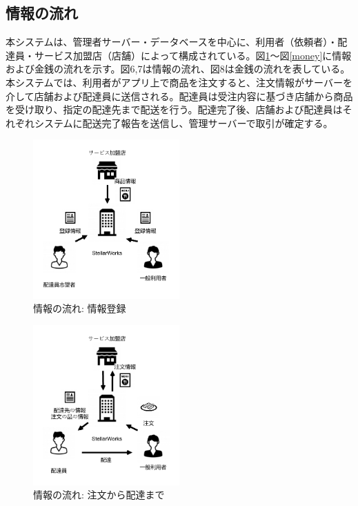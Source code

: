 \subsection{情報の流れ}
本システムは、管理者サーバー・データベースを中心に、利用者（依頼者）・配達員・サービス加盟店（店舗）によって構成されている。図\ref{system}～図\ref{money}に情報および金銭の流れを示す。図6,7は情報の流れ、図8は金銭の流れを表している。
本システムでは、利用者がアプリ上で商品を注文すると、注文情報がサーバーを介して店舗および配達員に送信される。配達員は受注内容に基づき店舗から商品を受け取り、指定の配達先まで配送を行う。配達完了後、店舗および配達員はそれぞれシステムに配送完了報告を送信し、管理サーバーで取引が確定する。

\begin{figure}[H]
  \centering
  \includegraphics[width=0.5\textwidth]{情報の流れ.drawio.pdf}
  \caption{情報の流れ: 情報登録}
  \label{system}
\end{figure}

\begin{figure}[H]
  \centering
  \includegraphics[width=0.5\textwidth]{流れ.drawio.pdf}
  \caption{情報の流れ: 注文から配達まで}
  \label{oder}
\end{figure}


